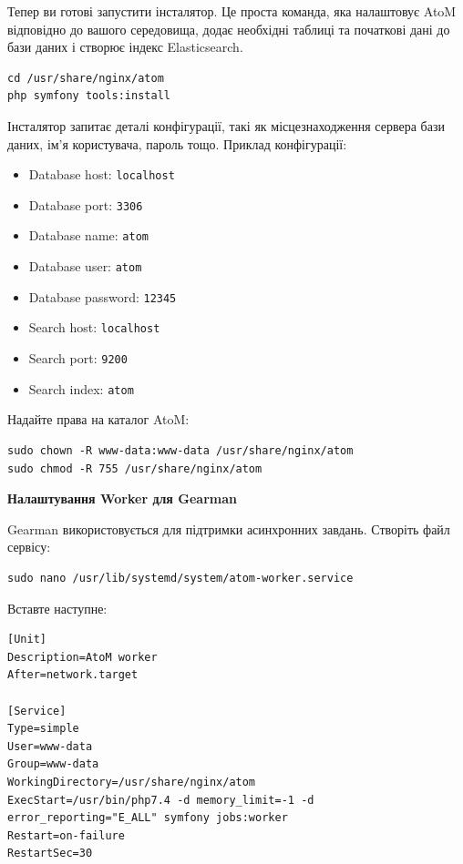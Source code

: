 \documentclass[14pt,a4paper]{article}
\begin{document}
\begin{large}
Тепер ви готові запустити інсталятор. Це проста команда, яка налаштовує AtoM відповідно до вашого середовища, додає необхідні таблиці та початкові дані до бази даних і створює індекс Elasticsearch.

\begin{lstlisting}
cd /usr/share/nginx/atom
php symfony tools:install
\end{lstlisting}

Інсталятор запитає деталі конфігурації, такі як місцезнаходження сервера бази даних, ім’я користувача, пароль тощо. Приклад конфігурації:

\begin{itemize}
    \item Database host: \texttt{localhost}
    \item Database port: \texttt{3306}
    \item Database name: \texttt{atom}
    \item Database user: \texttt{atom}
    \item Database password: \texttt{12345}
    \item Search host: \texttt{localhost}
    \item Search port: \texttt{9200}
    \item Search index: \texttt{atom}
\end{itemize}

Надайте права на каталог AtoM:

\begin{lstlisting}
sudo chown -R www-data:www-data /usr/share/nginx/atom
sudo chmod -R 755 /usr/share/nginx/atom
\end{lstlisting}

\textbf{Налаштування Worker для Gearman}

Gearman використовується для підтримки асинхронних завдань. Створіть файл сервісу:

\begin{lstlisting}
sudo nano /usr/lib/systemd/system/atom-worker.service
\end{lstlisting}

Вставте наступне:

\begin{lstlisting}
[Unit]
Description=AtoM worker
After=network.target

[Service]
Type=simple
User=www-data
Group=www-data
WorkingDirectory=/usr/share/nginx/atom
ExecStart=/usr/bin/php7.4 -d memory_limit=-1 -d error_reporting="E_ALL" symfony jobs:worker
Restart=on-failure
RestartSec=30


\end{lstlisting}
\end{large}
\end{document}
